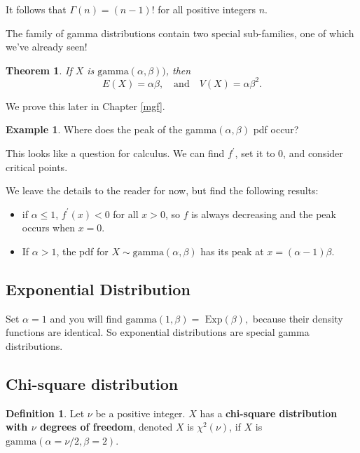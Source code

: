\documentclass[
]{book}
\providecommand{\tightlist}{%
  \setlength{\itemsep}{0pt}\setlength{\parskip}{0pt}}
\newtheorem{theorem}{Theorem}[chapter]
\theoremstyle{definition}
\newtheorem{definition}{Definition}[chapter]
\theoremstyle{definition}
\newtheorem{example}{Example}[chapter]
\theoremstyle{definition}
\theoremstyle{definition}
\theoremstyle{remark}
\begin{document}
It follows that \(\Gamma(n) = (n-1)!\) for all positive integers \(n\).

The family of gamma distributions contain two special sub-families, one of which we've already seen!

\begin{theorem}
\protect\hypertarget{thm:gamma-EandV}{}\label{thm:gamma-EandV}If \(X\) is \(\text{gamma}(\alpha,\beta))\), then \[E(X) = \alpha\beta, ~~~ \text{ and } ~~~ V(X) = \alpha\beta^2.\]
\end{theorem}

We prove this later in Chapter \ref{mgf}.

\begin{example}

Where does the peak of the gamma\((\alpha,\beta)\) pdf occur?

This looks like a question for calculus. We can find \(f^\prime\), set it to 0, and consider critical points.

We leave the details to the reader for now, but find the following results:

\begin{itemize}
\tightlist
\item
  if \(\alpha \leq 1\), \(f^\prime(x) < 0\) for all \(x > 0\), so \(f\) is always decreasing and the peak occurs when \(x = 0\).
\item
  If \(\alpha > 1\), the pdf for \(X \sim \text{gamma}(\alpha, \beta)\) has its peak at \(x = (\alpha-1)\beta.\)
\end{itemize}

\end{example}

\subsection{Exponential Distribution}\label{exponential-distribution-1}

Set \(\alpha = 1\) and you will find \(\text{gamma}(1,\beta) = \text{ Exp}(\beta),\)
because their density functions are identical. So exponential distributions are special gamma distributions.

\subsection{Chi-square distribution}\label{chi-square-distribution}

\begin{definition}
\protect\hypertarget{def:chi-square}{}\label{def:chi-square}Let \(\nu\) be a positive integer. \(X\) has a \textbf{chi-square distribution with \(\nu\) degrees of freedom}, denoted \(X\) is \(\chi^2(\nu)\), if \(X\) is \(\text{gamma}(\alpha = \nu/2, \beta = 2).\)
\end{definition}
\end{document}
